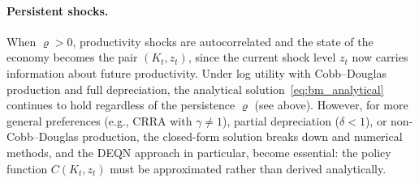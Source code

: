 \documentclass[11pt,a4paper]{report}
\begin{document}
\paragraph{Persistent shocks.}  When $\varrho > 0$, productivity shocks are autocorrelated and the state of the economy becomes the pair $(K_t, z_t)$, since the current shock level $z_t$ now carries information about future productivity.  Under log utility with Cobb--Douglas production and full depreciation, the analytical solution~\eqref{eq:bm_analytical} continues to hold regardless of the persistence $\varrho$ (see above).  However, for more general preferences (e.g., CRRA with $\gamma \neq 1$), partial depreciation ($\delta < 1$), or non-Cobb--Douglas production, the closed-form solution breaks down and numerical methods, and the DEQN approach in particular, become essential: the policy function $C(K_t, z_t)$ must be approximated rather than derived analytically.
\end{document}

